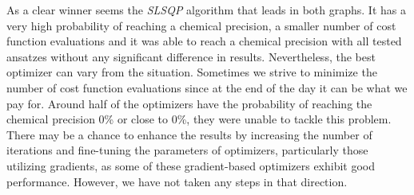 As a clear winner seems the \textit{SLSQP} algorithm that leads in both graphs. It has a very high probability of reaching a chemical precision, a smaller number of cost function evaluations and it was able to reach a chemical precision with all tested ansatzes without any significant difference in results. Nevertheless, the best optimizer can vary from the situation. Sometimes we strive to minimize the number of cost function evaluations since at the end of the day it can be what we pay for. Around half of the optimizers have the probability of reaching the chemical precision 0\% or close to 0\%, they were unable to tackle this problem. There may be a chance to enhance the results by increasing the number of iterations and fine-tuning the parameters of optimizers, particularly those utilizing gradients, as some of these gradient-based optimizers exhibit good performance. However, we have not taken any steps in that direction.